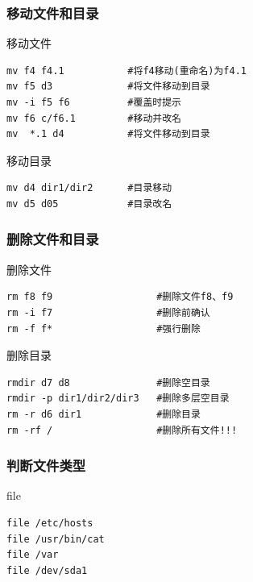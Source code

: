 \documentclass[xcolor=svgnames,presentation]{beamer}
\begin{document}
\begin{frame}[fragile]
\frametitle{移动文件和目录}
\label{sec-1-1-3}
\begin{exampleblock}{移动文件}
\label{sec-1-1-3-1}


\begin{verbatim}
mv f4 f4.1           #将f4移动(重命名)为f4.1
mv f5 d3             #将文件移动到目录
mv -i f5 f6          #覆盖时提示
mv f6 c/f6.1         #移动并改名
mv  *.1 d4           #将文件移动到目录
\end{verbatim}
\end{exampleblock}
\begin{block}{移动目录}
\label{sec-1-1-3-2}


\begin{verbatim}
mv d4 dir1/dir2      #目录移动
mv d5 d05            #目录改名
\end{verbatim}
\end{block}
\end{frame}
\begin{frame}[fragile]
\frametitle{删除文件和目录}
\label{sec-1-1-4}
\begin{exampleblock}{删除文件}
\label{sec-1-1-4-1}


\begin{verbatim}
rm f8 f9                  #删除文件f8、f9
rm -i f7                  #删除前确认
rm -f f*                  #强行删除
\end{verbatim}
\end{exampleblock}
\begin{block}{删除目录}
\label{sec-1-1-4-2}


\begin{verbatim}
rmdir d7 d8               #删除空目录
rmdir -p dir1/dir2/dir3   #删除多层空目录
rm -r d6 dir1             #删除目录
rm -rf /                  #删除所有文件!!!
\end{verbatim}
\end{block}
\end{frame}
\begin{frame}[fragile]
\frametitle{判断文件类型}
\label{sec-1-1-5}
\begin{exampleblock}{file}
\label{sec-1-1-5-1}


\begin{verbatim}
file /etc/hosts
file /usr/bin/cat
file /var
file /dev/sda1
\end{verbatim}
\end{exampleblock}
\end{frame}
\end{document}
